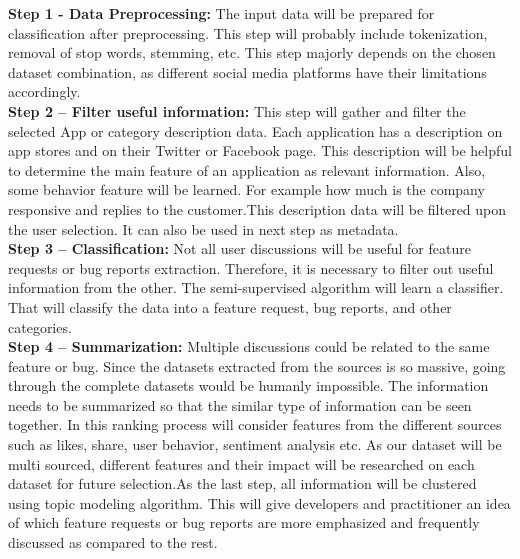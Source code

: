 \textbf{Step 1 - Data Preprocessing: } The input data will be prepared for classification after preprocessing. This step will probably include tokenization, removal of stop words, stemming, etc. This step majorly depends on the chosen dataset combination, as different social media platforms have their limitations accordingly.\\

\textbf{Step 2 –  Filter useful information: } This step will gather and filter the selected App or category description data. Each application has a description on app stores and on their Twitter or Facebook page. This description will be helpful to determine the main feature of an application as relevant information. Also, some behavior feature will be learned.  For example how much is the company responsive and replies to the customer.This description data will be filtered upon the user selection. It can also be used in next step as metadata.\\

\textbf{Step 3 –  Classification: } Not all user discussions will be useful for feature requests or bug reports extraction. Therefore, it is necessary to filter out useful information from the other. The semi-supervised algorithm will learn a classifier. That will classify the data into a feature request, bug reports, and other categories.\\

\textbf{Step 4 – Summarization: } Multiple discussions could be related to the same feature or bug.
Since the datasets extracted from the sources is so massive, going through the complete datasets
would be humanly impossible. The information needs to be summarized so that the similar type
of information can be seen together. In this ranking process will consider features from the different sources such as likes, share, user behavior, sentiment analysis etc. As our dataset will be multi sourced, different features and their impact will be researched on each dataset for future selection.As the last step, all information will be clustered using topic modeling algorithm. This will
give developers and practitioner an idea of which feature requests or bug reports are more emphasized and frequently discussed as compared to the rest.\\

